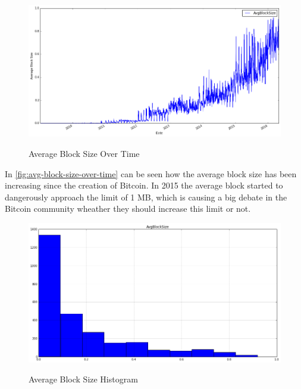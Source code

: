 \begin{figure}[bth]
  \myfloatalign
  {\includegraphics[width=1\linewidth]
    {gfx/avg-block-size-over-time}} 
  \caption{Average Block Size Over Time}
  \label{fig:avg-block-size-over-time}
\end{figure}

In \autoref{fig:avg-block-size-over-time} can be seen how the average
block size has been increasing since the creation of Bitcoin. In 2015
the average block started to dangerously approach the limit of 1 MB,
which is causing a big debate in the Bitcoin community wheather they
should increase this limit or not.

\begin{figure}[bth]
  \myfloatalign
  {\includegraphics[width=1\linewidth]
    {gfx/avg-block-size-histogram}} 
  \caption{Average Block Size Histogram}
  \label{fig:avg-block-size-histogram}
\end{figure}

